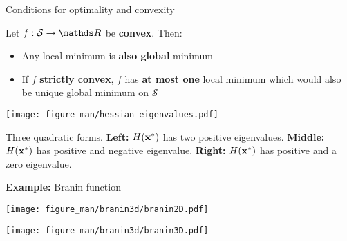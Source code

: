 \documentclass[11pt,compress,t,notes=noshow, xcolor=table]{beamer}
\begin{document}
\begin{vbframe}{Conditions for optimality and convexity}

Let $f:\mathcal{S} \to \R$ be \textbf{convex}.
Then:

\begin{itemize}
    \item Any local minimum is \textbf{also global} minimum 
    \item If $f$ \textbf{strictly convex}, $f$ has \textbf{at most one} local minimum which would also be unique global minimum on $\mathcal{S}$
\end{itemize}

\begin{center}
    \texttt{[image: figure\_man/hessian-eigenvalues.pdf]} \\
    \begin{footnotesize}
      Three quadratic forms.
      \textbf{Left:} $H(\mathbf{x}^\ast)$ has two positive eigenvalues.
      \textbf{Middle:} $H(\mathbf{x}^\ast)$ has positive and negative eigenvalue.
      \textbf{Right:} $H(\mathbf{x}^\ast)$ has positive and a zero eigenvalue.
    \end{footnotesize}
\end{center}

\framebreak 

\textbf{Example:} Branin function

\vspace{-3\baselineskip}

\begin{center}
    \begin{minipage}[c]{0.4\textwidth}
        \texttt{[image: figure\_man/branin3d/branin2D.pdf]}
    \end{minipage}
    \begin{minipage}[c]{0.4\textwidth}
        \texttt{[image: figure\_man/branin3d/branin3D.pdf]}
    \end{minipage}
\end{center}

\vspace{-3\baselineskip}


\end{vbframe}
\end{document}
